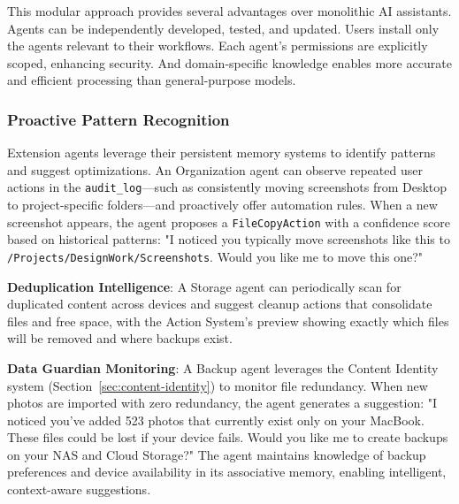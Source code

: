 \documentclass[sigconf]{acmart}
\begin{document}
This modular approach provides several advantages over monolithic AI assistants. Agents can be independently developed, tested, and updated. Users install only the agents relevant to their workflows. Each agent's permissions are explicitly scoped, enhancing security. And domain-specific knowledge enables more accurate and efficient processing than general-purpose models.

\subsubsection{Proactive Pattern Recognition}

Extension agents leverage their persistent memory systems to identify patterns and suggest optimizations. An Organization agent can observe repeated user actions in the \texttt{audit\_log}—such as consistently moving screenshots from Desktop to project-specific folders—and proactively offer automation rules. When a new screenshot appears, the agent proposes a \texttt{FileCopyAction} with a confidence score based on historical patterns: "I noticed you typically move screenshots like this to \texttt{/Projects/DesignWork/Screenshots}. Would you like me to move this one?"

\textbf{Deduplication Intelligence}: A Storage agent can periodically scan for duplicated content across devices and suggest cleanup actions that consolidate files and free space, with the Action System's preview showing exactly which files will be removed and where backups exist.

\textbf{Data Guardian Monitoring}: A Backup agent leverages the Content Identity system (Section~\ref{sec:content-identity}) to monitor file redundancy. When new photos are imported with zero redundancy, the agent generates a suggestion: "I noticed you've added 523 photos that currently exist only on your MacBook. These files could be lost if your device fails. Would you like me to create backups on your NAS and Cloud Storage?" The agent maintains knowledge of backup preferences and device availability in its associative memory, enabling intelligent, context-aware suggestions.
\end{document}
